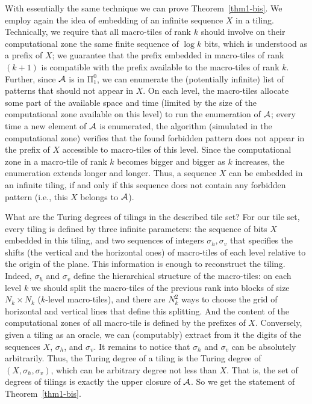 \documentclass[runningheads]{llncs}
\begin{document}
With essentially the same technique we can prove Theorem~\ref{thm1-bis}. We employ again the idea of embedding of an infinite sequence $X$ in a tiling. Technically, we require that all macro-tiles of rank $k$ should involve on their computational zone the same finite sequence of $\log k$ bits, which is understood as a prefix of $X$; we guarantee that the prefix embedded in macro-tiles of rank $(k+1)$ is compatible with the prefix available to the macro-tiles of rank $k$. Further, since $\cal A$ is in $\mathrm \Pi_1^0$, we can enumerate the (potentially infinite) list of patterns that should not appear in $X$. On each level, the macro-tiles allocate some part of  the available space and time (limited by the size of the computational zone available on this level) to run the enumeration of $\cal A$; every time a new element of $\cal A$ is enumerated,  the algorithm (simulated in the computational zone) verifies that the found forbidden pattern does not appear in the prefix of $X$ accessible to macro-tiles of this level. Since the computational zone in a macro-tile of rank $k$ becomes bigger and bigger as $k$ increases, the enumeration extends longer and longer. Thus, a sequence $X$ can be embedded in an infinite tiling, if and only if this sequence does not contain any forbidden pattern (i.e., this $X$ belongs to $\cal A$).

What are the Turing degrees of tilings in the described tile set? For our tile set, every tiling is defined by three infinite parameters: the sequence of bits $X$ embedded in this tiling, and two sequences of integers $\sigma_h, \sigma_v$ that specifies the shifts (the vertical and the horizontal ones) of macro-tiles of each level relative to the origin of the plane. This information is enough to reconstruct the tiling. Indeed, $\sigma_h$ and $\sigma_v$ define the hierarchical  structure of the macro-tiles: on each level $k$ we should split the macro-tiles of the previous rank into blocks of size $N_k\times N_k$ ($k$-level macro-tiles), and there are $N_k^2$ ways to choose the grid of horizontal and vertical lines that define this splitting. And the content of the computational zones of all macro-tile is defined by the prefixes of $X$.
Conversely, given a tiling as an oracle, we can (computably) extract from it the digits of the sequences $X$, $\sigma_h$, and $\sigma_v$.
It remains to notice that $\sigma_h$ and $\sigma_v$ can be absolutely arbitrarily.
Thus, the Turing degree of a tiling is the Turing degree of  $(X,\sigma_h, \sigma_v)$, which can be arbitrary degree not less than $X$. That is, the set of degrees of tilings is exactly the upper closure of ${\cal A}$. So we get the statement of  Theorem~\ref{thm1-bis}.
\end{document}
